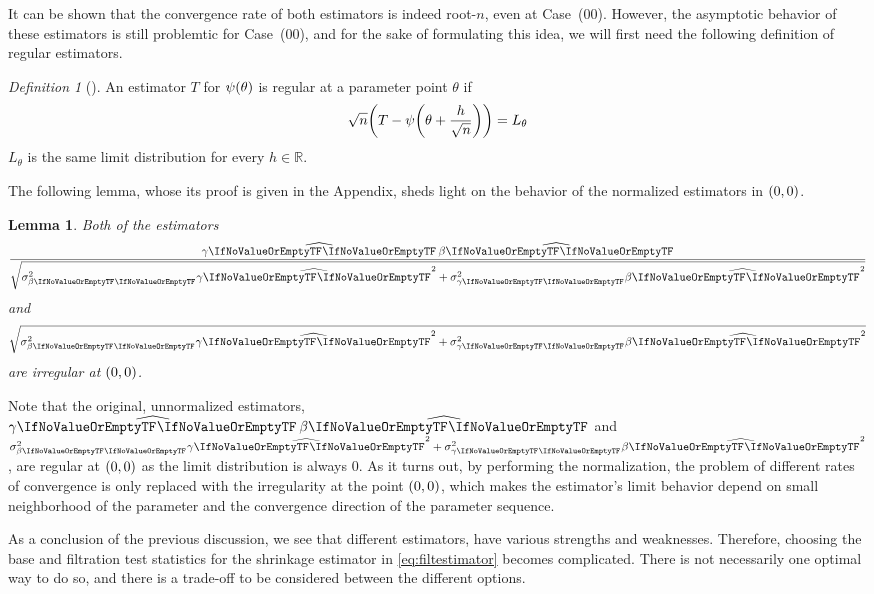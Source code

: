 \documentclass[ejs, twoside]{imsart}
\theoremstyle{plain}
\newtheorem{lemma}[theorem]{Lemma}
\theoremstyle{remark}
\newtheorem{definition}[theorem]{Definition}
\newcommand{\real}{\mathbb{R}}
\newcommand{\estim}[1]{\widehat{\regcoef{#1}}}
\newcommand{\nullcase}[1]{(#1)}
\numberwithin{equation}{section}
\numberwithin{table}{section}
\numberwithin{figure}{section}
\let\originalleft\left
\let\originalright\right
\renewcommand{\left}{\mathopen{}\mathclose\bgroup\originalleft}
\renewcommand{\right}{\aftergroup\egroup\originalright}
\begin{document}
It can be shown that the convergence rate of both estimators is indeed root-\(n\), even at Case~\nullcase{00}. However, the asymptotic behavior of these estimators is still problemtic for Case~\nullcase{00}, and for the sake of formulating this idea, we will first need the following definition of regular estimators.

\begin{definition}[{\citealp[Chapter~8.5]{van_der_vaart_asymptotic_1998}}] \label{def:regest}
	An estimator \(T\) for \(\psi \left( \theta \right) \) is regular at a parameter point \(\theta\) if
	\[\sqrt{n} \left( T - \psi \left( \theta + \frac{h}{\sqrt{n}} \right) \right) = L_\theta \]
	\(L_\theta\) is the same limit distribution for every \(h \in \real\).
\end{definition}

The following lemma, whose its proof is given in the Appendix, sheds light on the behavior of the normalized estimators in \(\left( 0,0\right) \).

\begin{lemma} \label{lem:irregularity}
	Both of the estimators \[\frac{\product}{\sqrt{\sigma_{\regcoef{2}}^2 \estim{1}^2 + \sigma_{\regcoef{1}}^2 \estim{2}^2}}\] and \[\sqrt{\sigma_{\regcoef{2}}^2 \estim{1}^2 + \sigma_{\regcoef{1}}^2 \estim{2}^2}\] are  irregular at \(\left(0,0 \right) \).
\end{lemma}

Note that the original, unnormalized estimators, \(\product\) and \(\sigma_{\regcoef{2}}^2 \estim{1}^2 + \sigma_{\regcoef{1}}^2 \estim{2}^2\), are regular at \(\left(0,0 \right) \) as the limit distribution is always \(0\). As it turns out, by performing the normalization, the problem of different rates of convergence is only replaced with the irregularity at the point \(\left(0,0 \right) \), which makes the estimator's limit behavior depend on small neighborhood of the parameter and the convergence direction of the parameter sequence.


As a conclusion of the previous discussion, we see that different estimators, have various strengths and weaknesses. Therefore, choosing the base and filtration test statistics for the shrinkage estimator in \eqref{eq:filtestimator} becomes complicated. There is not necessarily one optimal way to do so, and there is a trade-off to be considered between the different options.
\end{document}
